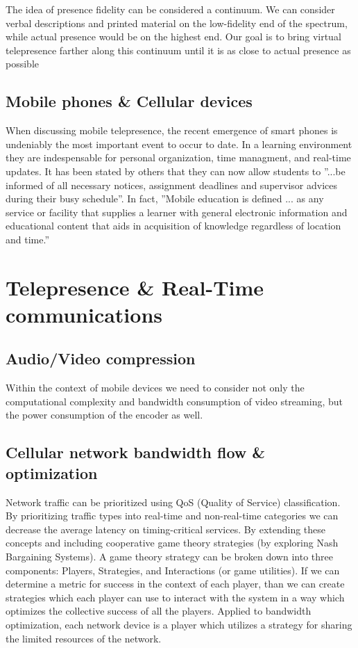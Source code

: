 \documentclass[a4paper,12pt]{report}
\begin{document}
The idea of presence fidelity can be considered a continuum. We can consider verbal descriptions and printed material on the low-fidelity end of the spectrum, while actual presence would be on the highest end. Our goal is to bring virtual telepresence farther along this continuum until it is as close to actual presence as possible \cite{726589}

\subsection{Mobile phones \& Cellular devices} When discussing mobile telepresence, the recent emergence of smart phones is undeniably the most important event to occur to date. In a learning environment they are indespensable for personal organization, time managment, and real-time updates. It has been stated by others that they can now allow students to ''...be informed of all necessary notices, assignment deadlines and supervisor advices during their busy schedule''. In fact, ''Mobile education is defined ... as any service or facility that supplies a learner with general electronic information and educational content that aids in acquisition of knowledge regardless of location and time.'' \cite{4469080}

\cite{6007847}
\section{Telepresence \& Real-Time communications}
\subsection{Audio/Video compression}
\cite{4297087}
\cite{4801602}

Within the context of mobile devices we need to consider not only the computational complexity and bandwidth consumption of video streaming, but the power consumption of the encoder as well.
\cite{5054795}
\subsection{Cellular network bandwidth flow \& optimization}

Network traffic can be prioritized using QoS (Quality of Service) classification. By prioritizing traffic types into real-time and non-real-time categories we can decrease the average latency on timing-critical services. By extending these concepts and including cooperative game theory strategies (by exploring Nash Bargaining Systems). A game theory strategy can be broken down into three components: Players, Strategies, and Interactions (or game utilities). If we can determine a metric for success in the context of each player, than we can create strategies which each player can use to interact with the system in a way which optimizes the collective success of all the players. Applied to bandwidth optimization, each network device is a player which utilizes a strategy for sharing the limited resources of the network.
\end{document}
